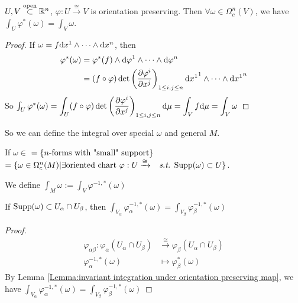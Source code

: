 \begin{lemma}\label{Lemma:invariant integration under orientation preserving map}
    $ U,V\overset{\text{open}}{\subset}\mathbb R^n $, $ \varphi:U\xrightarrow{\cong}V $ is orientation preserving. Then  $ \forall \omega\in \Omega_c^n(V) $, we have  $ \int_U\varphi^*(\omega)=\int_V\omega $.    
\end{lemma}
\begin{proof}
   If $ \omega=f\mathrm{d} {x}^1\wedge\cdots\wedge\mathrm{d} {x}^n $, then 
   \begin{equation}
       \begin{aligned}
           \varphi^*(\omega)&=\varphi^*(f)\wedge\mathrm{d} {\varphi}^1\wedge\cdots\wedge\mathrm{d} {\varphi}^n\\
           &=(f\circ\varphi)\det\left(\frac{\partial \varphi^i}{\partial x^j}\right)_{1 \leq i,j \leq n}\mathrm{d} {x^1}^1\wedge\cdots\wedge\mathrm{d} {x^1}^n
       \end{aligned}
   \end{equation}
   So  $ \int_U\varphi^*(\omega)=\displaystyle\int_U (f\circ\varphi)\det\left(\frac{\partial \varphi^i}{\partial x^j}\right)_{1 \leq i,j \leq n}\mathrm{d} \mu=\int_Vf\mathrm{d} \mu=\int_V\omega$ 
     
\end{proof}
So we can define the integral over special  $ \omega $ and  general  $ M $.
\begin{definition}
   If  $ \omega\in  $ $ =\{\text{$ n $-forms with "small" support}\} $ \\ $  = \{\omega\in\Omega_c^n(M)|\exists\text{oriented chart  $ \varphi:U\xrightarrow{ \cong} $ \st }\Supp(\omega)\subset U\} $.
   
   We define  $ \int_M\omega:=\int_V\varphi^{-1,*}(\omega) $ 
\end{definition} 
\begin{claim}
   If  $ \mathrm{Supp}(\omega)\subset U_\alpha\cap U_\beta $, then  $ \int_{V_\alpha}\varphi_\alpha^{-1,*}(\omega)=\int_{V_\beta}\varphi_\beta^{-1,*}(\omega) $  
\end{claim}
\begin{proof}
   \begin{align*}
       \varphi_{\alpha\beta}:\varphi_\alpha(U_\alpha\cap U_\beta)&\xrightarrow{\cong}\varphi_\beta(U_\alpha\cap U_\beta)\\
       \varphi_\alpha^{-1,*}(\omega)&\mapsto \varphi_\beta^*(\omega)
   \end{align*}
   By Lemma \ref{Lemma:invariant integration under orientation preserving map}, we have  $ \int_{V_\alpha}\varphi_\alpha^{-1,*}(\omega)=\int_{V_\beta}\varphi_\beta^{-1,*}(\omega) $ 
\end{proof}

